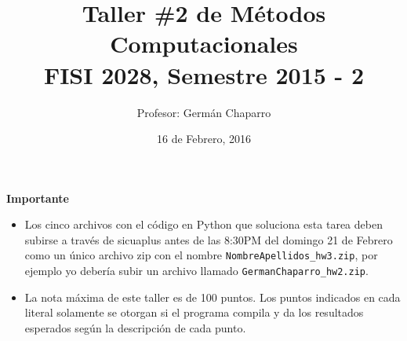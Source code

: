 \documentclass{article}
\title{Taller \#2 de M\'etodos Computacionales\\ FISI 2028, Semestre 2015 - 2}
\author{Profesor: Germ\'an Chaparro}
\date{16 de Febrero, 2016}
\begin{document}
\maketitle
\thispagestyle{empty}


{\bf Importante}
\begin{itemize}

\item Los cinco archivos con el c\'odigo en Python que soluciona esta
  tarea deben subirse a trav\'es de sicuaplus antes de las 8:30PM del
  domingo 21 de Febrero como un \'unico archivo zip con el nombre
  \verb"NombreApellidos_hw3.zip", por ejemplo yo deber\'ia subir un
  archivo llamado \verb"GermanChaparro_hw2.zip". 

\item La nota m\'axima de este taller es de 100 puntos. Los puntos indicados
  en cada literal solamente se otorgan si el programa compila y da los
  resultados esperados seg\'un la descripci\'on de cada punto.
 
\end{itemize}
\end{document}

